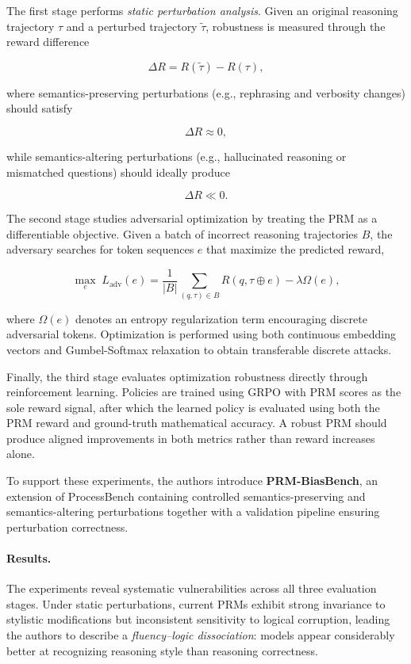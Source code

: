 \documentclass[11pt]{article}
\begin{document}
The first stage performs \emph{static perturbation analysis}. Given an original reasoning trajectory \(\tau\) and a perturbed trajectory \(\tilde{\tau}\), robustness is measured through the reward difference

\[
\Delta R = R(\tilde{\tau}) - R(\tau),
\]

where semantics-preserving perturbations (e.g., rephrasing and verbosity changes) should satisfy

\[
\Delta R \approx 0,
\]

while semantics-altering perturbations (e.g., hallucinated reasoning or mismatched questions) should ideally produce

\[
\Delta R \ll 0.
\]

The second stage studies adversarial optimization by treating the PRM as a differentiable objective. Given a batch of incorrect reasoning trajectories \(B\), the adversary searches for token sequences \(e\) that maximize the predicted reward,

\[
\max_e
\;
L_{\mathrm{adv}}(e)
=
\frac{1}{|B|}
\sum_{(q,\tau)\in B}
R(q,\tau\oplus e)
-
\lambda \Omega(e),
\]

where \(\Omega(e)\) denotes an entropy regularization term encouraging discrete adversarial tokens. Optimization is performed using both continuous embedding vectors and Gumbel-Softmax relaxation to obtain transferable discrete attacks.

Finally, the third stage evaluates optimization robustness directly through reinforcement learning. Policies are trained using GRPO with PRM scores as the sole reward signal, after which the learned policy is evaluated using both the PRM reward and ground-truth mathematical accuracy. A robust PRM should produce aligned improvements in both metrics rather than reward increases alone.

To support these experiments, the authors introduce \textbf{PRM-BiasBench}, an extension of ProcessBench containing controlled semantics-preserving and semantics-altering perturbations together with a validation pipeline ensuring perturbation correctness.

\paragraph{Results.}
The experiments reveal systematic vulnerabilities across all three evaluation stages. Under static perturbations, current PRMs exhibit strong invariance to stylistic modifications but inconsistent sensitivity to logical corruption, leading the authors to describe a \emph{fluency--logic dissociation}: models appear considerably better at recognizing reasoning style than reasoning correctness.
\end{document}
